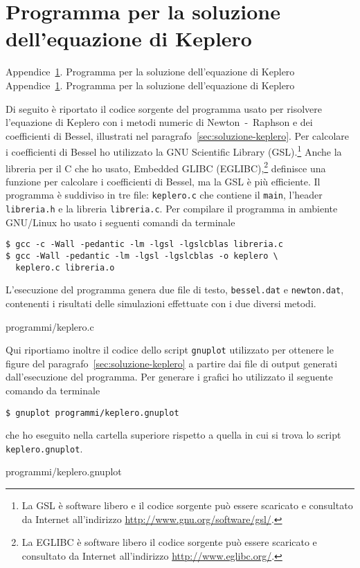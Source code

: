 \chapter{Programma per la soluzione dell'equazione di Keplero}
\label{cha:soluzione-keplero}
\markboth%
{Appendice~\ref{cha:soluzione-keplero}. Programma per la soluzione
  dell'equazione di Keplero}%
{Appendice~\ref{cha:soluzione-keplero}. Programma per la soluzione
  dell'equazione di Keplero}

Di seguito è riportato il codice sorgente del programma usato per risolvere
l'equazione di Keplero con i metodi numeric di Newton~-~Raphson e dei
coefficienti di Bessel, illustrati nel
paragrafo~\ref{sec:soluzione-keplero}. Per calcolare i coefficienti di Bessel ho
utilizzato la GNU Scientific Library (GSL).\footnote{La GSL è software libero e
  il codice sorgente può essere scaricato e consultato da Internet all'indirizzo
  \url{http://www.gnu.org/software/gsl/}.} Anche la libreria per il C che ho
usato, Embedded GLIBC (EGLIBC),\footnote{La EGLIBC è software libero il codice
  sorgente può essere scaricato e consultato da Internet all'indirizzo
  \url{http://www.eglibc.org/}.} definisce una funzione per calcolare i
coefficienti di Bessel, ma la GSL è più efficiente. Il programma è suddiviso in
tre file: \verb|keplero.c| che contiene il \verb|main|, l'header
\verb|libreria.h| e la libreria \verb|libreria.c|. Per compilare il programma in
ambiente GNU/Linux ho usato i seguenti comandi da terminale
\begin{verbatim}
$ gcc -c -Wall -pedantic -lm -lgsl -lgslcblas libreria.c
$ gcc -Wall -pedantic -lm -lgsl -lgslcblas -o keplero \
  keplero.c libreria.o
\end{verbatim}
L'esecuzione del programma genera due file di testo, \verb|bessel.dat| e
\verb|newton.dat|, contenenti i risultati delle simulazioni effettuate con i due
diversi metodi.

{programmi/keplero.c}



Qui riportiamo inoltre il codice dello script \verb|gnuplot| utilizzato per
ottenere le figure del paragrafo~\ref{sec:soluzione-keplero} a partire dai file
di output generati dall'esecuzione del programma. Per generare i grafici ho
utilizzato il seguente comando da terminale
\begin{verbatim}
$ gnuplot programmi/keplero.gnuplot
\end{verbatim}
che ho eseguito nella cartella superiore rispetto a quella in cui si trova lo
script \verb|keplero.gnuplot|.

{programmi/keplero.gnuplot}

